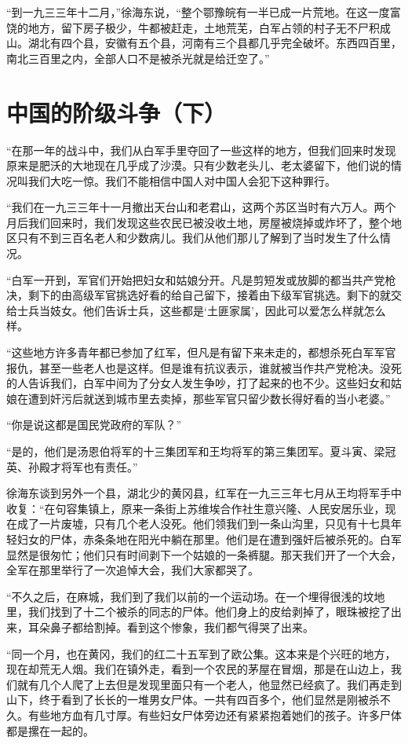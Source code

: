 \documentclass[10pt]{book}
\begin{document}
“到一九三三年十二月，”徐海东说，“整个鄂豫皖有一半已成一片荒地。在这一度富饶的地方，留下房子极少，牛都被赶走，土地荒芜，白军占领的村子无不尸积成山。湖北有四个县，安徽有五个县，河南有三个县都几乎完全破坏。东西四百里，南北三百里之内，全部人口不是被杀光就是给迁空了。”



\section{中国的阶级斗争（下）}

“在那一年的战斗中，我们从白军手里夺回了一些这样的地方，但我们回来时发现原来是肥沃的大地现在几乎成了沙漠。只有少数老头儿、老太婆留下，他们说的情况叫我们大吃一惊。我们不能相信中国人对中国人会犯下这种罪行。

“我们在一九三三年十一月撤出天台山和老君山，这两个苏区当时有六万人。两个月后我们回来时，我们发现这些农民已被没收土地，房屋被烧掉或炸坏了，整个地区只有不到三百名老人和少数病儿。我们从他们那儿了解到了当时发生了什么情况。

“白军一开到，军官们开始把妇女和姑娘分开。凡是剪短发或放脚的都当共产党枪决，剩下的由高级军官挑选好看的给自己留下，接着由下级军官挑选。剩下的就交给士兵当妓女。他们告诉士兵，这些都是‘土匪家属’，因此可以爱怎么样就怎么样。

“这些地方许多青年都已参加了红军，但凡是有留下来未走的，都想杀死白军军官报仇，甚至一些老人也是这样。但是谁有抗议表示，谁就被当作共产党枪决。没死的人告诉我们，白军中间为了分女人发生争吵，打了起来的也不少。这些妇女和姑娘在遭到奸污后就送到城市里去卖掉，那些军官只留少数长得好看的当小老婆。”

“你是说这都是国民党政府的军队？”

“是的，他们是汤恩伯将军的十三集团军和王均将军的第三集团军。夏斗寅、梁冠英、孙殿才将军也有责任。”

徐海东谈到另外一个县，湖北少的黄冈县，红军在一九三三年七月从王均将军手中收复：“在句容集镇上，原来一条街上苏维埃合作社生意兴隆、人民安居乐业，现在成了一片废墟，只有几个老人没死。他们领我们到一条山沟里，只见有十七具年轻妇女的尸体，赤条条地在阳光中躺在那里。他们是在遭到强奸后被杀死的。白军显然是很匆忙；他们只有时间剥下一个姑娘的一条裤腿。那天我们开了一个大会，全军在那里举行了一次追悼大会，我们大家都哭了。

“不久之后，在麻城，我们到了我们以前的一个运动场。在一个埋得很浅的坟地里，我们找到了十二个被杀的同志的尸体。他们身上的皮给剥掉了，眼珠被挖了出来，耳朵鼻子都给割掉。看到这个惨象，我们都气得哭了出来。

“同一个月，也在黄冈，我们的红二十五军到了欧公集。这本来是个兴旺的地方，现在却荒无人烟。我们在镇外走，看到一个农民的茅屋在冒烟，那是在山边上，我们就有几个人爬了上去但是发现里面只有一个老人，他显然已经疯了。我们再走到山下，终于看到了长长的一堆男女尸体。一共有四百多个，他们显然是刚被杀不久。有些地方血有几寸厚。有些妇女尸体旁边还有紧紧抱着她们的孩子。许多尸体都是摞在一起的。
\end{document}
